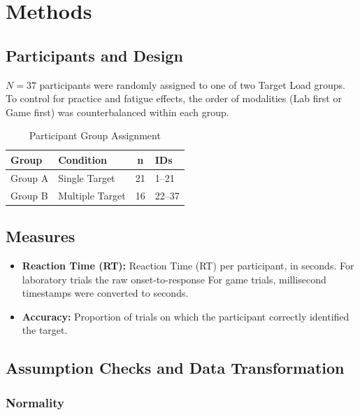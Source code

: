 \documentclass[12pt]{article}
\begin{document}
\section{Methods}

\subsection{Participants and Design}

$N = 37$ participants were randomly assigned to one of two Target Load
groups. To control for practice and fatigue effects, the order of modalities
(Lab first or Game first) was counterbalanced within each group.

\begin{table}[H]
  \centering
  \caption{Participant Group Assignment}
  \begin{tabular}{llcl}
    \toprule
    \textbf{Group} & \textbf{Condition} & \textbf{n} & \textbf{IDs} \\
    \midrule
    Group A & Single Target & 21 & 1--21 \\
    Group B & Multiple Target & 16 & 22--37 \\
    \bottomrule
  \end{tabular}
\end{table}

\subsection{Measures}

\begin{itemize}
  \item \textbf{Reaction Time (RT):} Reaction Time (RT) per participant, in seconds. For laboratory trials the raw onset-to-response
For game trials, millisecond timestamps were converted to
    seconds.
  \item \textbf{Accuracy:} Proportion of trials on which the participant
    correctly identified the target.
\end{itemize}


\subsection{Assumption Checks and Data Transformation}

\subsubsection{Normality}
\end{document}
